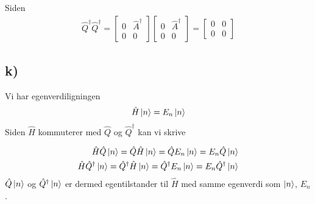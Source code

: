\documentclass[norsk,a4paper,12pt]{article}
\begin{document}
Siden
\begin{equation}
\begin{aligned}
	\hat{Q}^\dagger\hat{Q}^\dagger = \left[ \begin{matrix} 0 & \hat A^\dagger \\ 0 & 0 \end{matrix} \right] \left[ \begin{matrix} 0 & \hat A^\dagger \\ 0 & 0 \end{matrix} \right] = \left[ \begin{matrix} 0 & 0 \\ 0 & 0 \end{matrix} \right]
\end{aligned}
\end{equation}

\subsection*{k)}
Vi har egenverdiligningen
\begin{equation}
\begin{aligned}
	\hat{H}\ket{n} = E_n \ket{n}
\end{aligned}
\end{equation}
Siden $\hat{H}$ kommuterer med $\hat{Q}$ og $\hat{Q}^\dagger$ kan vi skrive

\begin{equation}
\begin{aligned}
\hat{H}\hat{Q}\ket{n} = \hat{Q}\hat{H}\ket{n} = \hat{Q} E_n \ket{n} = E_n \hat{Q}\ket{n} \\
\hat{H}\hat{Q}^\dagger\ket{n} = \hat{Q}^\dagger\hat{H}\ket{n} = \hat{Q}^\dagger E_n \ket{n} = E_n \hat{Q}^\dagger\ket{n}
\end{aligned}
\end{equation}
$\hat{Q}\ket{n}$ og $\hat{Q}^\dagger\ket{n}$ er dermed egentilstander til $\hat{H}$ med samme egenverdi som $\ket{n}$, $E_n$.
\end{document}
